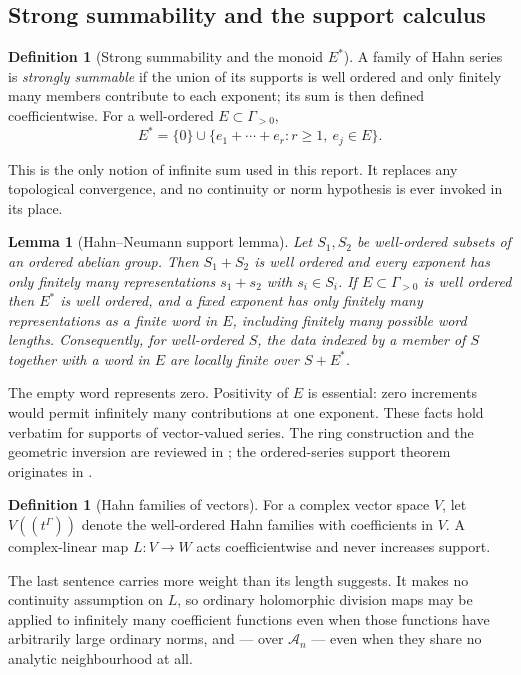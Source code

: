 \documentclass[11pt,letterpaper]{article}
\newtheorem{lemma}[theorem]{Lemma}
\theoremstyle{definition}
\newtheorem{definition}[theorem]{Definition}
\theoremstyle{remark}
\newcommand{\A}{\mathscr A}
\numberwithin{equation}{section}
\begin{document}
\subsection{Strong summability and the support calculus}
\label{analytic:subsec:summability}
\begin{definition}[Strong summability and the monoid $E^*$]
\label{analytic:def:strong-sum}
A family of Hahn series is \emph{strongly summable} if the union of its
supports is well ordered and only finitely many members contribute to each
exponent; its sum is then defined coefficientwise. For a well-ordered
$E\subset\Gamma_{>0}$,
\[
 E^*=\{0\}\cup\{e_1+\cdots+e_r:r\ge1,\ e_j\in E\}.
\]
\end{definition}

This is the only notion of infinite sum used in this report. It replaces
any topological convergence, and no continuity or norm hypothesis is ever
invoked in its place.

\begin{lemma}[Hahn--Neumann support lemma]\label{analytic:lem:neumann}
Let $S_1,S_2$ be well-ordered subsets of an ordered abelian group. Then
$S_1+S_2$ is well ordered and every exponent has only finitely many
representations $s_1+s_2$ with $s_i\in S_i$. If $E\subset\Gamma_{>0}$ is
well ordered then $E^*$ is well ordered, and a fixed exponent has only
finitely many representations as a finite word in $E$, including finitely
many possible word lengths. Consequently, for well-ordered $S$, the data
indexed by a member of $S$ together with a word in $E$ are locally finite
over $S+E^*$.
\end{lemma}

The empty word represents zero. Positivity of $E$ is essential: zero
increments would permit infinitely many contributions at one exponent. These
facts hold verbatim for supports of vector-valued series. The ring
construction and the geometric inversion are reviewed in \cite[\S3]{Poonen};
the ordered-series support theorem originates in \cite{Neumann}.

\begin{definition}[Hahn families of vectors]\label{analytic:def:vector-hahn}
For a complex vector space $V$, let $V((t^\Gamma))$ denote the well-ordered
Hahn families with coefficients in $V$. A complex-linear map $L:V\to W$ acts
coefficientwise and never increases support.
\end{definition}

The last sentence carries more weight than its length suggests. It makes no
continuity assumption on $L$, so ordinary holomorphic division maps may be
applied to infinitely many coefficient functions even when those functions
have arbitrarily large ordinary norms, and --- over $\A_n$ --- even when
they share no analytic neighbourhood at all.
\end{document}
